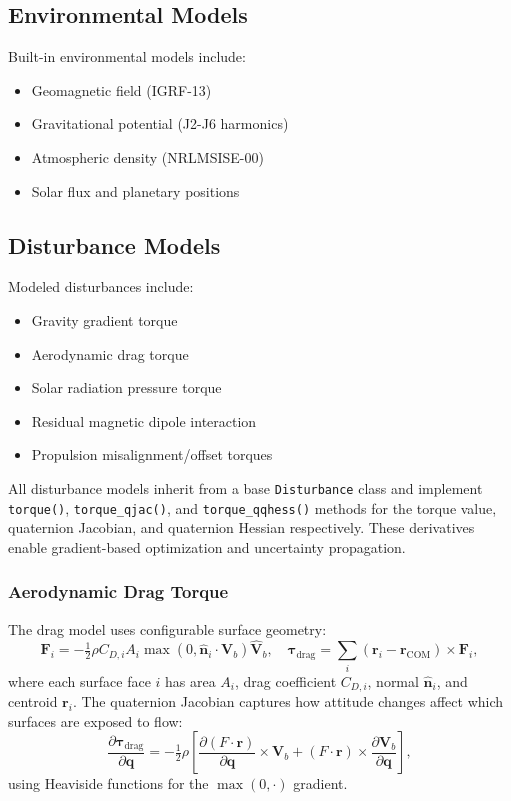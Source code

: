 \documentclass[conference]{IEEEtran}
\begin{document}
\subsection{Environmental Models}\label{subsec:env_models}

Built-in environmental models include:
\begin{itemize}
    \item Geomagnetic field (IGRF-13)
    \item Gravitational potential (J2-J6 harmonics)
    \item Atmospheric density (NRLMSISE-00)
    \item Solar flux and planetary positions
\end{itemize}

\subsection{Disturbance Models}\label{subsec:disturbance_models}

Modeled disturbances include:
\begin{itemize}
    \item Gravity gradient torque
    \item Aerodynamic drag torque
    \item Solar radiation pressure torque
    \item Residual magnetic dipole interaction
    \item Propulsion misalignment/offset torques
\end{itemize}

All disturbance models inherit from a base \texttt{Disturbance} class and implement \texttt{torque()}, \texttt{torque\_qjac()}, and \texttt{torque\_qqhess()} methods for the torque value, quaternion Jacobian, and quaternion Hessian respectively. These derivatives enable gradient-based optimization and uncertainty propagation.

\subsubsection{Aerodynamic Drag Torque}
The drag model uses configurable surface geometry:
\begin{equation}
\mathbf{F}_i = -\tfrac{1}{2}\rho C_{D,i} A_i \max(0, \hat{\mathbf{n}}_i \cdot \mathbf{V}_b) \hat{\mathbf{V}}_b, \quad
\boldsymbol{\tau}_{\text{drag}} = \sum_i (\mathbf{r}_i - \mathbf{r}_{\text{COM}}) \times \mathbf{F}_i,
\end{equation}
where each surface face $i$ has area $A_i$, drag coefficient $C_{D,i}$, normal $\hat{\mathbf{n}}_i$, and centroid $\mathbf{r}_i$. The quaternion Jacobian captures how attitude changes affect which surfaces are exposed to flow:
\begin{equation}
\frac{\partial \boldsymbol{\tau}_{\text{drag}}}{\partial \mathbf{q}} = -\tfrac{1}{2}\rho\left[\frac{\partial (F \cdot \mathbf{r})}{\partial \mathbf{q}} \times \mathbf{V}_b + (F \cdot \mathbf{r}) \times \frac{\partial \mathbf{V}_b}{\partial \mathbf{q}}\right],
\end{equation}
using Heaviside functions for the $\max(0, \cdot)$ gradient.
\end{document}
